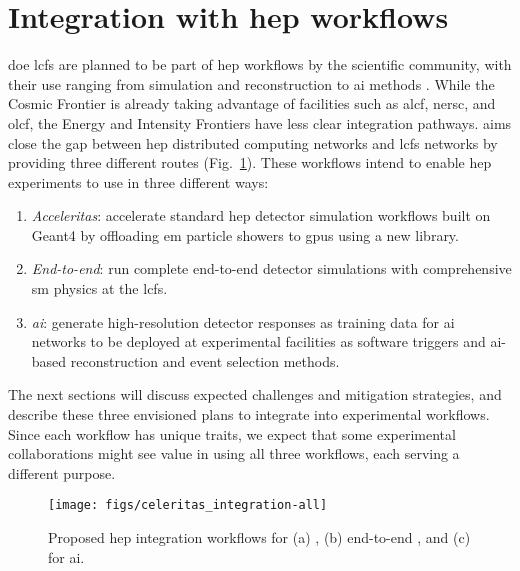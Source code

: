 \section{Integration with \ac{hep} workflows}

\ac{doe} \acp{lcf} are planned to be part of \ac{hep} workflows by the
scientific community, with their use ranging from simulation and reconstruction
to \ac{ai} methods \cite{hep-network-requirements}. While the Cosmic Frontier is
already taking advantage of facilities such as \ac{alcf}, \ac{nersc}, and
\ac{olcf}, the Energy and Intensity Frontiers have less clear integration
pathways. \celeritas aims close the gap between \ac{hep} distributed computing
networks and \acp{lcf} networks by providing three different routes
(Fig.~\ref{fig:celeritas-hep-workflows}).
These workflows intend to enable \ac{hep} experiments to use \celeritas in three
different ways:
\begin{enumerate}[itemsep=0pt, label=(\alph*)]
  \item \emph{Acceleritas}: accelerate standard \ac{hep} detector simulation
    workflows built on Geant4 by offloading \ac{em} particle showers to
    \acp{gpu} using a new \acceleritas library.
  \item \emph{End-to-end}: run complete end-to-end detector simulations with
    comprehensive \ac{sm} physics at the \acp{lcf}.
  \item \emph{\ac{ai}}: generate high-resolution detector responses as training
    data for \ac{ai} networks to be deployed at experimental facilities as
    software triggers and \ac{ai}-based reconstruction and event selection
    methods.
\end{enumerate}
The next sections will discuss expected challenges and mitigation strategies,
and describe these three envisioned plans to integrate \celeritas into
experimental workflows. Since each workflow has unique traits, we expect that
some experimental collaborations might see value in using all three workflows,
each serving a different purpose.

\begin{figure}[h]
    \centering
    \texttt{[image: figs/celeritas\_integration-all]}
    \caption{Proposed \acs{hep} integration workflows for (a) \acceleritas, (b)
    end-to-end \celeritas, and (c) \celeritas for \acs{ai}.}
    \label{fig:celeritas-hep-workflows}
\end{figure}

